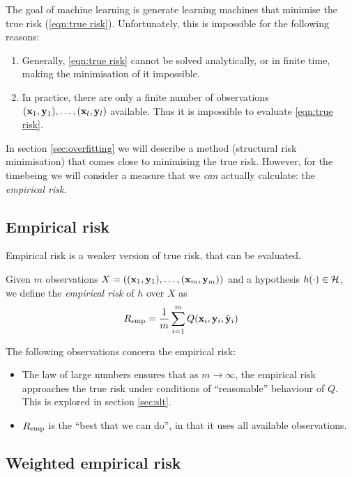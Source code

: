 The goal of machine learning is generate learning machines that
minimise the true risk (\ref{eqn:true risk}).  Unfortunately, this is
impossible for the following reasons:
%
\begin{enumerate}
\item	Generally, \ref{eqn:true risk} cannot be solved analytically,
	or in finite time, making the minimisation of it impossible.
%
\item	In practice, there are only a finite number of observations
	$(\mathbf{x}_1, \mathbf{y}_1), \ldots, (\mathbf{x}_l, \mathbf{y}_l)$ available.  Thus
	it is impossible to evaluate \ref{eqn:true risk}.
\end{enumerate}
%
In section \ref{sec:overfitting} we will describe a method (structural
risk minimisation) that comes close to minimising the true risk.
However, for the timebeing we will consider a measure that we
\emph{can} actually calculate: the \emph{empirical risk}.


\subsection{Empirical risk}
\label{sec:empirical risk}
Empirical risk is a weaker version of true risk, that can be
evaluated.

\begin{definition}
Given $m$ observations $X = ((\mathbf{x}_1, \mathbf{y}_1), \ldots, (\mathbf{x}_m,
\mathbf{y}_m))$ and a hypothesis $h(\cdot) \in \mathcal{H}$, we define the
\emph{empirical risk} of $h$ over $X$ as 
%
\begin{equation}
R_{\mathrm{emp}} = \frac{1}{m} \sum_{i=1}^{m} Q(\mathbf{x}_i, \mathbf{y}_i, \hat{\mathbf{y}}_i)
\end{equation}
\end{definition}

The following observations concern the empirical risk:
%
\begin{itemize}
\item 	The law of large numbers ensures that as $m \rightarrow
	\infty$, the empirical risk approaches the true risk under
	conditions of ``reasonable'' behaviour of $Q$.  This is
	explored in section \ref{sec:slt}.
\item	$R_{\mathrm{emp}}$ is the ``best that we can do'', in that it uses all
	available observations.
\end{itemize}


\subsection{Weighted empirical risk}
\label{sec:weighted empirical risk}

